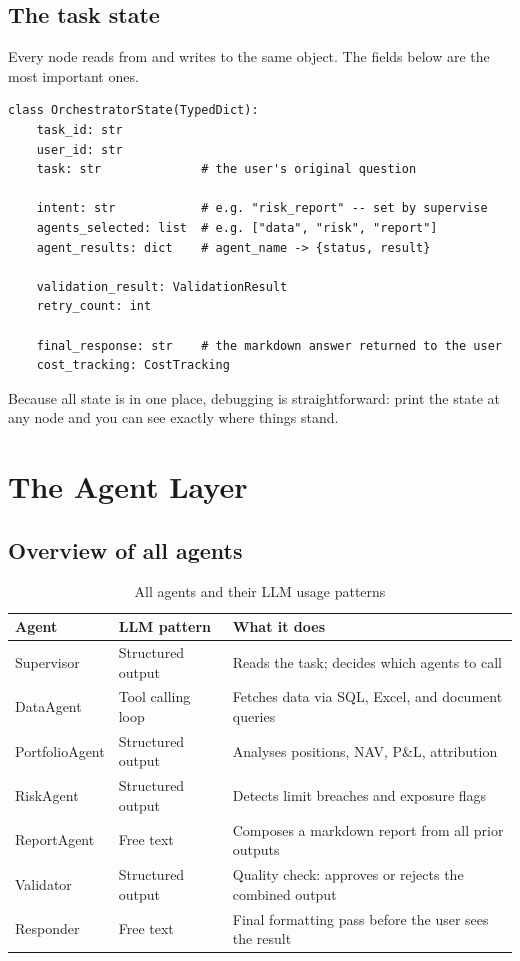 \documentclass[12pt,a4paper]{article}
\begin{document}
\subsection{The task state}

Every node reads from and writes to the same object. The fields below are the most important ones.

\begin{lstlisting}[caption={Core fields of OrchestratorState}]
class OrchestratorState(TypedDict):
    task_id: str
    user_id: str
    task: str              # the user's original question

    intent: str            # e.g. "risk_report" -- set by supervise
    agents_selected: list  # e.g. ["data", "risk", "report"]
    agent_results: dict    # agent_name -> {status, result}

    validation_result: ValidationResult
    retry_count: int

    final_response: str    # the markdown answer returned to the user
    cost_tracking: CostTracking
\end{lstlisting}

Because all state is in one place, debugging is straightforward: print the state at any node and you can see exactly where things stand.


\section{The Agent Layer}

\subsection{Overview of all agents}

\begin{table}[H]
\centering
\small
\begin{tabular}{@{}p{3.2cm}p{3.2cm}p{7.3cm}@{}}
\toprule
\textbf{Agent} & \textbf{LLM pattern} & \textbf{What it does} \\
\midrule
Supervisor     & Structured output & Reads the task; decides which agents to call \\
DataAgent      & Tool calling loop & Fetches data via SQL, Excel, and document queries \\
PortfolioAgent & Structured output & Analyses positions, NAV, P\&L, attribution \\
RiskAgent      & Structured output & Detects limit breaches and exposure flags \\
ReportAgent    & Free text         & Composes a markdown report from all prior outputs \\
Validator      & Structured output & Quality check: approves or rejects the combined output \\
Responder      & Free text         & Final formatting pass before the user sees the result \\
\bottomrule
\end{tabular}
\caption{All agents and their LLM usage patterns}
\end{table}
\end{document}
